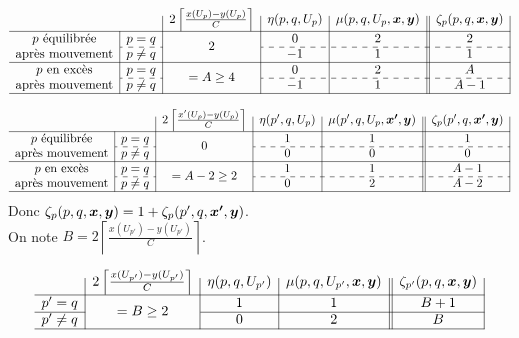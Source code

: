 \documentclass[twoside,11pt,openany,a4paper]{rapport}
\begin{document}
\begin{gather*}
  \begin{array}{c|c|c|c|c||c|}
    \multicolumn{2}{c|}{}
    & 2 \left\lceil \frac{x(U_p)-y(U_p)}{C} \right\rceil
    & \eta(p,q,U_p)
    & \mu(p,q,U_p,\bs{x},\bs{y})
    & \zeta_p(p,q,\bs{x},\bs{y})
    \\ \hline
    p \mbox{ équilibrée}
    & p=q
    & \multirow{2}{*}{$2$}
    & 0
    & 2
    & 2
    \\ \cdashline{2-2}\cdashline{4-6}
    \mbox{après mouvement}
    & p \ne q
    &
    & -1
    & 1
    & 1
    \\ \hline
    p \mbox{ en excès}
    & p=q
    & \multirow{2}{*}{$= A \ge 4$}
    & 0
    & 2
    & A
    \\ \cdashline{2-2}\cdashline{4-6}
    \mbox{après mouvement}
    & p \ne q
    &
    & -1
    & 1
    & A-1
    \\ \hline
  \end{array}
\end{gather*}

\begin{gather*}
  \begin{array}{c|c|c|c|c||c|}
    \multicolumn{2}{c|}{}
    & 2 \left\lceil \frac{x'(U_p)-y(U_p)}{C} \right\rceil
    & \eta(p',q,U_p)
    & \mu(p',q,U_p,\bs{x'},\bs{y})
    & \zeta_p(p',q,\bs{x'},\bs{y})
    \\ \hline
    p \mbox{ équilibrée}
    & p=q
    & \multirow{2}{*}{$0$}
    & 1
    & 1
    & 1
    \\ \cdashline{2-2}\cdashline{4-6}
    \mbox{après mouvement}
    & p \ne q
    &
    & 0
    & 0
    & 0
    \\ \hline
    p \mbox{ en excès}
    & p=q
    & \multirow{2}{*}{$= A-2 \ge 2$}
    & 1
    & 1
    & A-1
    \\ \cdashline{2-2}\cdashline{4-6}
    \mbox{après mouvement}
    & p \ne q
    &
    & 0
    & 2
    & A-2
    \\ \hline
  \end{array}
\end{gather*}
Donc $\zeta_p(p,q,\boldsymbol{x},\boldsymbol{y}) = 1 + \zeta_p(p',q,\boldsymbol{x'},\boldsymbol{y})$.
\\

On note $B = 2 \left\lceil \frac{\displaystyle x(U_{p'})-y(U_{p'})}{\displaystyle C} \right\rceil$.

\begin{gather*}
  \begin{array}{r|c|c|c||c|}
    & 2 \left\lceil \frac{x(U_{p'})-y(U_{p'})}{C} \right\rceil
    & \eta(p,q,U_{p'})
    & \mu(p,q,U_{p'},\bs{x},\bs{y})
    & \zeta_{p'}(p,q,\bs{x},\bs{y})
    \\ \hline
    p' = q
    & \multirow{2}{*}{$= B \ge 2$}
    & 1
    & 1
    & B + 1
    \\ \cline{1-1}\cline{3-5}
    p' \ne q
    &
    & 0
    & 2
    & B
    \\ \hline
  \end{array}
\end{gather*}
\end{document}
